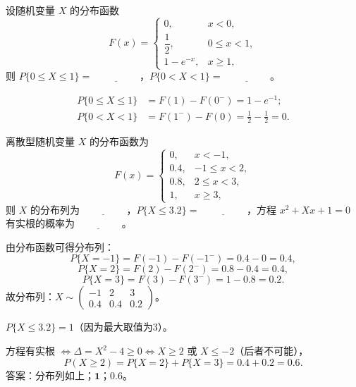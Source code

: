 \documentclass[lang=cn,11pt]{elegantbook}
\begin{document}
\begin{exercise}[分布函数计算] \label{exer:2-35}
设随机变量 $X$ 的分布函数
\[
F(x)=
\begin{cases}
0, & x<0, \\
\dfrac{1}{2}, & 0\leqslant x<1, \\
1-e^{-x}, & x\geqslant1,
\end{cases}
\]
则 $P\{0\leqslant X\leqslant1\}=\underline{\hspace{2cm}}$，$P\{0<X<1\}=\underline{\hspace{2cm}}$。
\end{exercise}

\begin{solution}
\[
\begin{aligned}
P\{0\leqslant X\leqslant1\}&=F(1)-F(0^-)=1-e^{-1}; \\
P\{0<X<1\}&=F(1^-)-F(0)=\frac{1}{2}-\frac{1}{2}=0.
\end{aligned}
\]
\end{solution}

\begin{exercise}[离散型分布求解] \label{exer:2-36}
离散型随机变量 $X$ 的分布函数为
\[
F(x)=
\begin{cases}
0, & x<-1, \\
0.4, & -1\leqslant x<2, \\
0.8, & 2\leqslant x<3, \\
1, & x\geqslant3,
\end{cases}
\]
则 $X$ 的分布列为$\underline{\hspace{2cm}}$，$P\{X\leqslant3.2\}=\underline{\hspace{2cm}}$，方程 $x^2+Xx+1=0$ 有实根的概率为$\underline{\hspace{2cm}}$。
\end{exercise}

\begin{solution}
由分布函数可得分布列：
\[
P\{X=-1\}=F(-1)-F(-1^-)=0.4-0=0.4,
\]
\[
P\{X=2\}=F(2)-F(2^-)=0.8-0.4=0.4,
\]
\[
P\{X=3\}=F(3)-F(3^-)=1-0.8=0.2.
\]
故分布列：$X\sim\begin{pmatrix}-1 & 2 & 3 \\ 0.4 & 0.4 & 0.2\end{pmatrix}$。

$P\{X\leqslant3.2\}=1$（因为最大取值为3）。

方程有实根 $\Leftrightarrow \Delta=X^2-4\geqslant0 \Leftrightarrow X\geqslant2$ 或 $X\leqslant-2$（后者不可能），
\[
P(X\geqslant2)=P\{X=2\}+P\{X=3\}=0.4+0.2=0.6.
\]
答案：分布列如上；$\boldsymbol{1}$；$\boldsymbol{0.6}$。
\end{solution}
\end{document}
